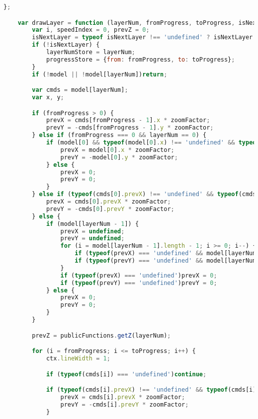 \begin{lstlisting}[language=JavaScript, label={lst:renderFactory}, caption=When render frames are requested this file compiles the lines of gcode from the worker and sets up the rest of the canvas frames.]
    };

    var drawLayer = function (layerNum, fromProgress, toProgress, isNextLayer) {
        var i, speedIndex = 0, prevZ = 0;
        isNextLayer = typeof isNextLayer !== 'undefined' ? isNextLayer : false;
        if (!isNextLayer) {
            layerNumStore = layerNum;
            progressStore = {from: fromProgress, to: toProgress};
        }
        if (!model || !model[layerNum])return;

        var cmds = model[layerNum];
        var x, y;

        if (fromProgress > 0) {
            prevX = cmds[fromProgress - 1].x * zoomFactor;
            prevY = -cmds[fromProgress - 1].y * zoomFactor;
        } else if (fromProgress === 0 && layerNum == 0) {
            if (model[0] && typeof(model[0].x) !== 'undefined' && typeof(model[0].y) !== 'undefined') {
                prevX = model[0].x * zoomFactor;
                prevY = -model[0].y * zoomFactor;
            } else {
                prevX = 0;
                prevY = 0;
            }
        } else if (typeof(cmds[0].prevX) !== 'undefined' && typeof(cmds[0].prevY) !== 'undefined') {
            prevX = cmds[0].prevX * zoomFactor;
            prevY = -cmds[0].prevY * zoomFactor;
        } else {
            if (model[layerNum - 1]) {
                prevX = undefined;
                prevY = undefined;
                for (i = model[layerNum - 1].length - 1; i >= 0; i--) {
                    if (typeof(prevX) === 'undefined' && model[layerNum - 1][i].x !== undefined)prevX = model[layerNum - 1][i].x * zoomFactor;
                    if (typeof(prevY) === 'undefined' && model[layerNum - 1][i].y !== undefined)prevY = -model[layerNum - 1][i].y * zoomFactor;
                }
                if (typeof(prevX) === 'undefined')prevX = 0;
                if (typeof(prevY) === 'undefined')prevY = 0;
            } else {
                prevX = 0;
                prevY = 0;
            }
        }

        prevZ = publicFunctions.getZ(layerNum);

        for (i = fromProgress; i <= toProgress; i++) {
            ctx.lineWidth = 1;

            if (typeof(cmds[i]) === 'undefined')continue;

            if (typeof(cmds[i].prevX) !== 'undefined' && typeof(cmds[i].prevY) !== 'undefined') {
                prevX = cmds[i].prevX * zoomFactor;
                prevY = -cmds[i].prevY * zoomFactor;
            }


\end{lstlisting}
